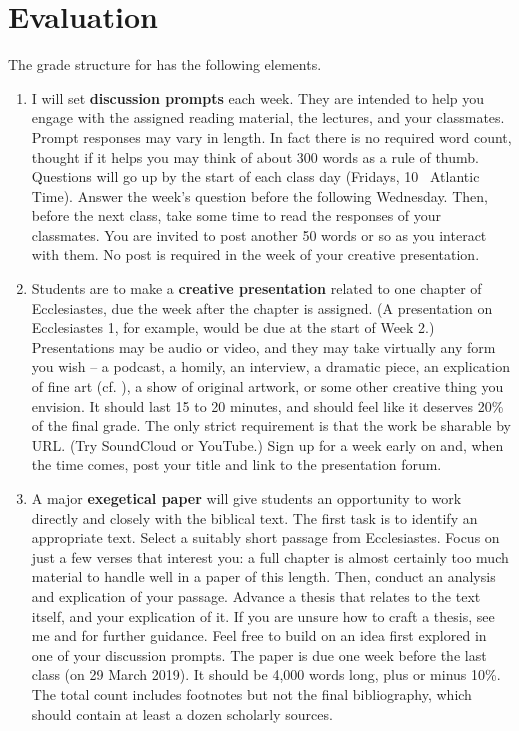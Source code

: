 \documentclass[titlepage]{article}
\begin{document}
\section{Evaluation}
\label{evaluation}

The grade structure for \ccode has the following elements.

\begin{enumerate}

	\item I will set \textbf{discussion prompts} each week. They are
	intended to help you engage with the assigned reading material, the
	lectures, and your classmates. Prompt responses may vary in length.
	In fact there is no required word count, thought if it helps you may
	think of about 300 words as a rule of thumb. Questions will go up by
	the start of each class day (Fridays, 10 \AM\ Atlantic Time). Answer
	the week's question before the following Wednesday. Then, before the
	next class, take some time to read the responses of your classmates.
	You are invited to post another 50 words or so as you interact with
	them. No post is required in the week of your creative presentation.

	\item Students are to make a \textbf{creative presentation} related
	to one chapter of Ecclesiastes, due the week after the chapter is
	assigned. (A presentation on Ecclesiastes 1, for example, would be
	due at the start of Week 2.) Presentations may be audio or video,
	and they may take virtually any form you wish -- a podcast, a
	homily, an interview, a dramatic piece, an explication of fine art
	(cf. \cite{Christianson}), a show of original artwork, or some other
	creative thing you envision. It should last 15 to 20 minutes, and
	should feel like it deserves 20\% of the final grade. The only
	strict requirement is that the work be sharable by URL. (Try
	SoundCloud or YouTube.) Sign up for a week early on and, when the
	time comes, post your title and link to the presentation forum.

	\item A major \textbf{exegetical paper} will give students an
	opportunity to work directly and closely with the biblical text. The
	first task is to identify an appropriate text.  Select a suitably
	short passage from Ecclesiastes. Focus on just a few verses that
	interest you: a full chapter is almost certainly too much material
	to handle well in a paper of this length. Then, conduct an analysis
	and explication of your passage. Advance a thesis that relates to
	the text itself, and your explication of it. If you are unsure how
	to craft a thesis, see me and \cite[Chs 3, 5, 8, 11]{rlgs} for
	further guidance. Feel free to build on an idea first explored in
	one of your discussion prompts. The paper is due one week before the
	last class (on 29 March 2019). It should be 4,000 words long, plus
	or minus 10\%. The total count includes footnotes but not the final
	bibliography, which should contain at least a dozen scholarly
	sources.

\end{enumerate}
\end{document}
